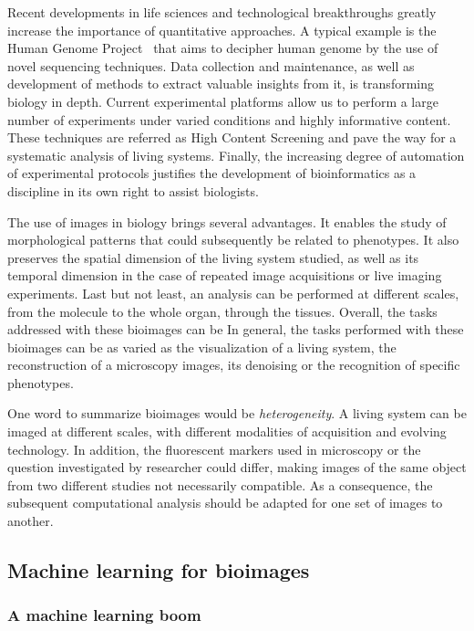 Recent developments in life sciences and technological breakthroughs greatly increase the importance of quantitative approaches.
A typical example is the Human Genome Project~\cite{lander_initial_2001} that aims to decipher human genome by the use of novel sequencing techniques.
Data collection and maintenance, as well as development of methods to extract valuable insights from it, is transforming biology in depth.
Current experimental platforms allow us to perform a large number of experiments under varied conditions and highly informative content.
These techniques are referred as High Content Screening and pave the way for a systematic analysis of living systems.
Finally, the increasing degree of automation of experimental protocols justifies the development of bioinformatics as a discipline in its own right to assist biologists.

The use of images in biology brings several advantages.
It enables the study of morphological patterns that could subsequently be related to phenotypes.
It also preserves the spatial dimension of the living system studied, as well as its temporal dimension in the case of repeated image acquisitions or live imaging experiments.
Last but not least, an analysis can be performed at different scales, from the molecule to the whole organ, through the tissues.
Overall, the tasks addressed with these bioimages can be
In general, the tasks performed with these bioimages can be as varied as the visualization of a living system, the reconstruction of a microscopy images, its denoising or the recognition of specific phenotypes.

One word to summarize bioimages would be \emph{heterogeneity}.
A living system can be imaged at different scales, with different modalities of acquisition and evolving technology.
In addition, the fluorescent markers used in microscopy or the question investigated by researcher could differ, making images of the same object from two different studies not necessarily compatible.
As a consequence, the subsequent computational analysis should be adapted for one set of images to another.

\subsection{Machine learning for bioimages}
\label{subsec:intro_ml_tools}

\subsubsection{A machine learning boom}

